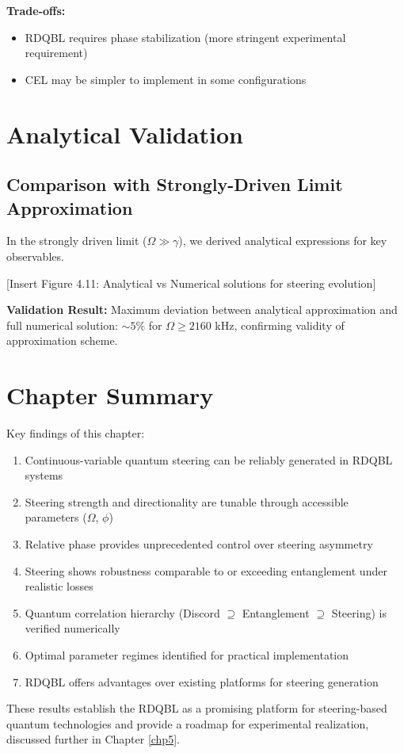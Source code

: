\textbf{Trade-offs:}
\begin{itemize}
	\item RDQBL requires phase stabilization (more stringent experimental requirement)
	\item CEL may be simpler to implement in some configurations
\end{itemize}

\section{Analytical Validation}

\subsection{Comparison with Strongly-Driven Limit Approximation}

In the strongly driven limit ($\Omega \gg \gamma$), we derived analytical expressions for key observables.

[Insert Figure 4.11: Analytical vs Numerical solutions for steering evolution]

\textbf{Validation Result:}
Maximum deviation between analytical approximation and full numerical solution: $\sim 5\%$ for $\Omega \geq 2160$ kHz, confirming validity of approximation scheme.

\section{Chapter Summary}

Key findings of this chapter:

\begin{enumerate}
	\item Continuous-variable quantum steering can be reliably generated in RDQBL systems
	\item Steering strength and directionality are tunable through accessible parameters ($\Omega$, $\phi$)
	\item Relative phase provides unprecedented control over steering asymmetry
	\item Steering shows robustness comparable to or exceeding entanglement under realistic losses
	\item Quantum correlation hierarchy (Discord $\supseteq$ Entanglement $\supseteq$ Steering) is verified numerically
	\item Optimal parameter regimes identified for practical implementation
	\item RDQBL offers advantages over existing platforms for steering generation
\end{enumerate}

These results establish the RDQBL as a promising platform for steering-based quantum technologies and provide a roadmap for experimental realization, discussed further in Chapter \ref{chp5}.

